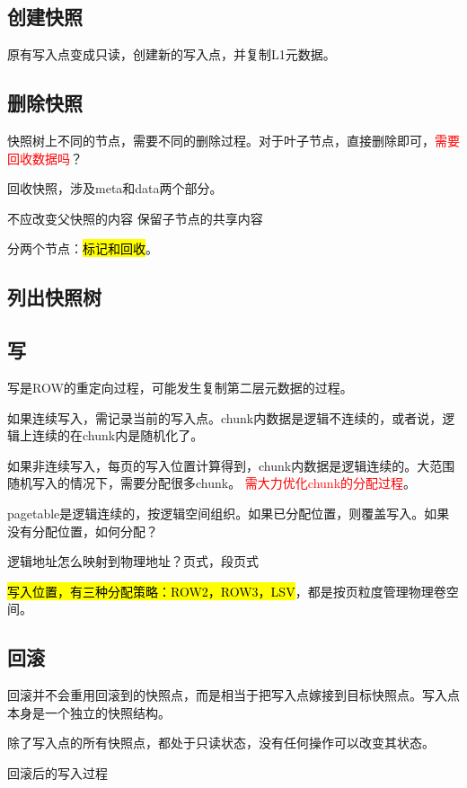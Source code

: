 \subsection{创建快照}

原有写入点变成只读，创建新的写入点，并复制L1元数据。

\subsection{删除快照}

快照树上不同的节点，需要不同的删除过程。对于叶子节点，直接删除即可，\textcolor{red}{需要回收数据吗}？

回收快照，涉及meta和data两个部分。

不应改变父快照的内容
保留子节点的共享内容

分两个节点：\hl{标记和回收}。

\subsection{列出快照树}

\subsection{写}

写是ROW的重定向过程，可能发生复制第二层元数据的过程。

如果连续写入，需记录当前的写入点。chunk内数据是逻辑不连续的，或者说，逻辑上连续的在chunk内是随机化了。

如果非连续写入，每页的写入位置计算得到，chunk内数据是逻辑连续的。大范围随机写入的情况下，需要分配很多chunk。
\textcolor{red}{需大力优化chunk的分配过程}。

pagetable是逻辑连续的，按逻辑空间组织。如果已分配位置，则覆盖写入。如果没有分配位置，如何分配？

逻辑地址怎么映射到物理地址？页式，段页式

\hl{写入位置，有三种分配策略：ROW2，ROW3，LSV}，都是按页粒度管理物理卷空间。

\subsection{回滚}

回滚并不会重用回滚到的快照点，而是相当于把写入点嫁接到目标快照点。写入点本身是一个独立的快照结构。

除了写入点的所有快照点，都处于只读状态，没有任何操作可以改变其状态。

回滚后的写入过程

